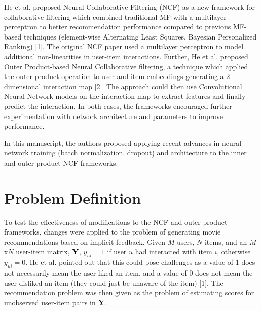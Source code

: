\documentclass{article}
\begin{document}
He et al. proposed Neural Collaborative Filtering (NCF) as a new framework for collaborative filtering which combined traditional MF with a multilayer perceptron to better recommendation performance compared to previous MF-based techniques (element-wise Alternating Least Squares, Bayesian Personalized Ranking) [1]. The original NCF paper used a multilayer perceptron to model additional non-linearities in user-item interactions. Further, He et al. proposed Outer Product-based Neural Collaborative filtering, a technique which applied the outer product operation to user and item embeddings generating a 2-dimensional interaction map [2]. The approach could then use Convolutional Neural Network models on the interaction map to extract features and finally predict the interaction. In both cases, the frameworks encouraged further experimentation with network architecture and parameters to improve performance.

In this manuscript, the authors proposed applying recent advances in neural network training (batch normalization, dropout) and architecture to the inner and outer product NCF frameworks.


\section{Problem Definition}
\label{sec:Problem Definition}
To test the effectiveness of modifications to the NCF and outer-product frameworks, changes were applied to the problem of generating movie recommendations based on implicit feedback. Given $M$ users, $N$ items, and an $M$x$N$ user-item matrix, $\bold{Y}$, $y_{ui} = 1$ if user $u$ had interacted with item $i$, otherwise $y_{ui} = 0$. He et al. pointed out that this could pose challenges as a value of 1 does not necessarily mean the user liked an item, and a value of 0 does not mean the user disliked an item (they could just be unaware of the item) [1]. The recommendation problem was then given as the problem of estimating scores for unobserved user-item pairs in $\bold{Y}$.
\end{document}
